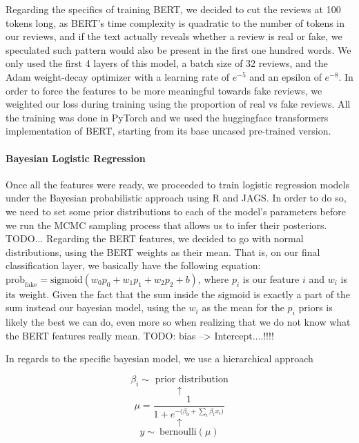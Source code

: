 \documentclass[man, floatsintext, 10pt]{apa6}
\begin{document}
Regarding the specifics of training BERT, we decided to cut the reviews at 100 tokens long, as BERT's time complexity is quadratic to the number of tokens in our reviews, and if the text actually reveals whether a review is real or fake, we speculated such pattern would also be present in the first one hundred words. We only used the first 4 layers of this model, a batch size of 32 reviews, and the Adam weight-decay optimizer with a learning rate of $e^{-5}$ and an epsilon of $e^{-8}$. In order to force the features to be more meaningful towards fake reviews, we weighted our loss during training using the proportion of real vs fake reviews. All the training was done in PyTorch and we used the huggingface transformers implementation of BERT, starting from its base uncased pre-trained version.

\vspace{2mm}

\paragraph{Bayesian Logistic Regression} Once all the features were ready, we proceeded to train logistic regression models under the Bayesian probabilistic approach using R and JAGS. In order to do so, we need to set some prior distributions to each of the model's parameters before we run the MCMC sampling process that allows us to infer their posteriors. TODO... Regarding the BERT features, we decided to go with normal distributions, using the BERT weights as their mean. That is, on our final classification layer, we basically have the following equation: $\text{prob}_{\text{fake}} = \text{sigmoid} (w_0 p_0 + w_1 p_1 + w_2 p_2 + b)$, where $p_i$ is our feature $i$ and $w_i$ is its weight. Given the fact that the sum inside the sigmoid is exactly a part of the sum instead our bayesian model, using the $w_i$ as the mean for the $p_i$ priors is likely the best we can do, even more so when realizing that we do not know what the BERT features really mean. TODO: bias --> Intercept....!!!!

In regards to the specific bayesian model, we use a hierarchical approach 

\[\beta_i \sim \text{ prior distribution} \] \[ \uparrow \] \[ \mu = \frac{1}{1 + e^{-\big(\beta_0 + \sum_i \beta_i x_i \big)}} \] \vspace{0.01mm}  \[ \uparrow \] \[ y \sim\ \text{bernoulli} (\mu) \]
\end{document}
